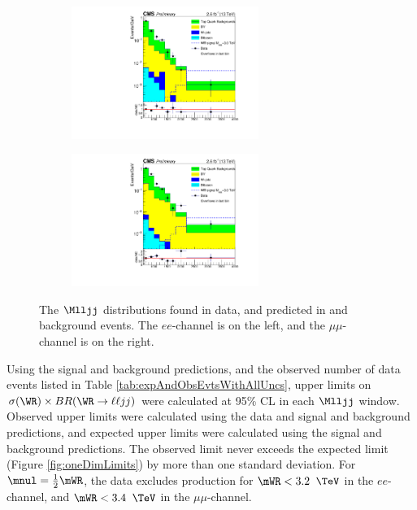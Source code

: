 \begin{figure}
	\centering
	\begin{subfigure}[t]{2.4in}
		\centering
		\includegraphics[width=2.4in]{figures/Mlljj_2012Bins_MWR3000Signal_SignalRegion_EEChannelBkgndMC_DYMadHTAndIncl_TTBarFromData_WithUnblindedData_withRatio_log.pdf}
	\end{subfigure}
	\thickspace
	\begin{subfigure}[t]{2.4in}
		\centering
		\includegraphics[width=2.4in]{figures/Mlljj_2012Bins_MWR3000Signal_SignalRegion_MuMuChannelBkgndMC_DYMadHTAndIncl_TTBarFromData_WithUnblindedData_withRatio_log.pdf}
	\end{subfigure}
	\caption{The $\Mlljj$ distributions found in data, and predicted in \WR and background events.  The $ee$-channel is 
	on the left, and the $\mu\mu$-channel is on the right.}
	\label{fig:obsAndExpMlljj}
\end{figure}

Using the signal and background predictions, and the observed number of data events listed in Table \ref{tab:expAndObsEvtsWithAllUncs}, upper 
limits on $\sigma(\WR) \times BR(\WR \rightarrow \ell\ell jj)$ were calculated at 95\% CL in each $\Mlljj$ window.  Observed upper limits 
were calculated using the data and signal and background predictions, and expected upper limits were calculated using the signal and 
background predictions.  The observed limit never exceeds the expected limit (Figure \ref{fig:oneDimLimits}) by more than one standard deviation.  
For $\mnul = \frac{1}{2}\mWR$, the data excludes \WR production for $\mWR < 3.2$ $\TeV$ in the $ee$-channel, and $\mWR < 3.4$ $\TeV$ in the 
$\mu\mu$-channel.

